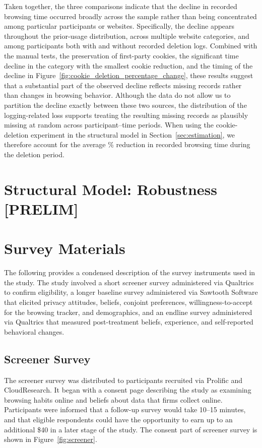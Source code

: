 \documentclass[12pt]{article}
\theoremstyle{definition}
\theoremstyle{remark}
\begin{document}
\begin{appendix}
Taken together, the three comparisons indicate that the decline in recorded browsing time occurred broadly across the sample rather than being concentrated among particular participants or websites. Specifically, the decline appears throughout the prior-usage distribution, across multiple website categories, and among participants both with and without recorded deletion logs. Combined with the manual tests, the preservation of first-party cookies, the significant time decline in the category with the smallest cookie reduction, and the timing of the decline in Figure~\ref{fig:cookie_deletion_percentage_change}, these results suggest that a substantial part of the observed decline reflects missing records rather than changes in browsing behavior. Although the data do not allow us to partition the decline exactly between these two sources, the distribution of the logging-related loss supports treating the resulting missing records as plausibly missing at random across participant--time periods. When using the cookie-deletion experiment in the structural model in Section~\ref{sec:estimation}, we therefore account for the average \cookieTimePct{}\% reduction in recorded browsing time during the deletion period.


\section{Structural Model: Robustness [PRELIM]}

\section{Survey Materials}\label{sec:survey_appendix}

The following provides a condensed description of the survey instruments used in the study. The study involved a short screener survey administered via Qualtrics to confirm eligibility, a longer baseline survey administered via Sawtooth Software that elicited privacy attitudes, beliefs, conjoint preferences, willingness-to-accept for the browsing tracker, and demographics, and an endline survey administered via Qualtrics that measured post-treatment beliefs, experience, and self-reported behavioral changes.

\subsection{Screener Survey}\label{sec:screener_survey}

The screener survey was distributed to participants recruited via Prolific and CloudResearch. It began with a consent page describing the study as examining browsing habits online and beliefs about data that firms collect online. Participants were informed that a follow-up survey would take 10--15 minutes, and that eligible respondents could have the opportunity to earn up to an additional \$40 in a later stage of the study. The consent part of screener survey is shown in Figure~\ref{fig:screener}.


\end{appendix}
\end{document}
